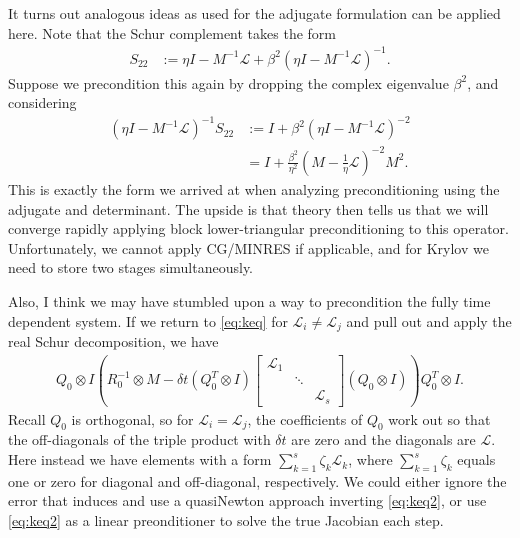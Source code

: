 \documentclass[a4paper,10pt]{article}
\begin{document}
It turns out analogous ideas as used for the adjugate formulation can be applied
here. Note that the Schur complement takes the form 
%
\begin{align*}
S_{22} & := \eta I - M^{-1}\mathcal{L} + \beta^2 (\eta I - M^{-1}\mathcal{L})^{-1}.
\end{align*}
%
Suppose we precondition this again by dropping the complex eigenvalue $\beta^2$,
and considering
%
\begin{align*}
(\eta I - M^{-1}\mathcal{L})^{-1}S_{22} & := I + \beta^2 (\eta I - M^{-1}\mathcal{L})^{-2}\\
 & = I + \frac{\beta^2}{\eta^2} (M - \tfrac{1}{\eta}\mathcal{L})^{-2}M^2.
\end{align*}
%
This is exactly the form we arrived at when analyzing preconditioning using the
adjugate and determinant. The upside is that theory then tells us that we will
converge rapidly applying block lower-triangular preconditioning to this operator. 
Unfortunately, we cannot apply CG/MINRES if applicable, and for Krylov we need to
store two stages simultaneously. 

Also, I think we may have stumbled upon a way to precondition the fully time
dependent system. If we return to \eqref{eq:keq} for $\mathcal{L}_i\neq\mathcal{L}_j$
and pull out and apply the real Schur decomposition, we have
\begin{align}\label{eq:keq2}
Q_0\otimes I\left( R_0^{-1}\otimes M - \delta t (Q_0^T\otimes I)
	\begin{bmatrix} \mathcal{L}_1  & \\ & \ddots \\ && \mathcal{L}_s\end{bmatrix}
	(Q_0\otimes I)\right)Q_0^T\otimes I.
\end{align}
%
Recall $Q_0$ is orthogonal, so for $\mathcal{L}_i = \mathcal{L}_j$, the coefficients
of $Q_0$ work out so that the off-diagonals of the triple product with $\delta t$
are zero and the diagonals are $\mathcal{L}$. Here instead we have elements with a
form $\sum_{k=1}^s \zeta_k\mathcal{L}_k$, where $\sum_{k=1}^s \zeta_k$ equals one
or zero for diagonal and off-diagonal, respectively. We could either ignore the error
that induces and use a quasiNewton approach inverting \eqref{eq:keq2}, or use
\eqref{eq:keq2} as a linear preonditioner to solve the true Jacobian each step.





\end{document}
